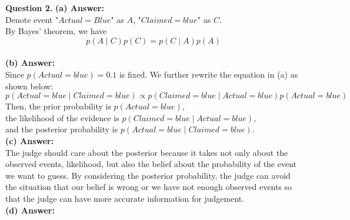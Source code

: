 \documentclass{article}
\begin{document}
\newpage
\noindent
\textbf{Question 2.}
\textbf{(a) Answer:}\\
Denote event "$Actual = Blue$" as $A$, "$Claimed = blue$" as $C$.\\
By Bayes' theorem, we have 
$$p(A \mid C)p(C) = p(C \mid A)p(A)$$\\

\noindent
\textbf{(b) Answer:}\\
Since $p(Actual = blue) = 0.1$ is fixed. We further rewrite the equation in (a) as shown below:
$$p(Actual = blue \mid Claimed = blue) \propto p(Claimed = blue \mid Actual = blue)p(Actual = blue)$$
Then, the prior probability is $p(Actual = blue)$,\\
the likelihood of the evidence is $p(Claimed = blue \mid Actual = blue)$,\\ and the posterior probability is $p(Actual = blue \mid Claimed = blue)$.\\

\noindent
\textbf{(c) Answer:}\\
The judge should care about the posterior because it takes not only about the observed events, likelihood, but also the belief about the probability of the event we want to guess. By considering the posterior probability, the judge can avoid the situation that our belief is wrong or we have not enough observed events so that the judge can have more accurate information for judgement.\\

\noindent
\textbf{(d) Answer:}\\
\end{document}
